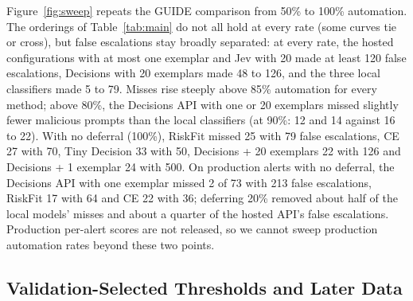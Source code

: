 \documentclass[letterpaper]{article} %
\begin{document}
Figure~\ref{fig:sweep} repeats the GUIDE comparison from 50\% to 100\% automation. The orderings of Table~\ref{tab:main} do not all hold at every rate (some curves tie or cross), but false escalations stay broadly separated: at every rate, the hosted configurations with at most one exemplar and Jev with 20 made at least 120 false escalations, Decisions with 20 exemplars made 48 to 126, and the three local classifiers made 5 to 79. Misses rise steeply above 85\% automation for every method; above 80\%, the Decisions API with one or 20 exemplars missed slightly fewer malicious prompts than the local classifiers (at 90\%: 12 and 14 against 16 to 22). With no deferral (100\%), RiskFit missed 25 with 79 false escalations, CE 27 with 70, Tiny Decision 33 with 50, Decisions + 20 exemplars 22 with 126 and Decisions + 1 exemplar 24 with 500. On production alerts with no deferral, the Decisions API with one exemplar missed 2 of 73 with 213 false escalations, RiskFit 17 with 64 and CE 22 with 36; deferring 20\% removed about half of the local models' misses and about a quarter of the hosted API's false escalations. Production per-alert scores are not released, so we cannot sweep production automation rates beyond these two points.

\subsection{Validation-Selected Thresholds and Later Data}
\end{document}
